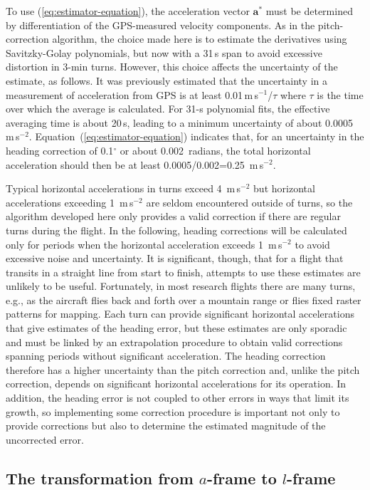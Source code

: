 \documentclass[english,british,amtd,bookmarks=false,unicode=true]{copernicus}\usepackage[]{graphicx}\usepackage[]{color}
\begin{document}
To use (\ref{eq:estimator-equation}), the acceleration vector $\mathbf{a^{*}}$
must be determined by differentiation of the GPS-measured velocity
components. As in the pitch-correction algorithm, the choice made
here is to estimate the derivatives using Savitzky-Golay polynomials,
but now with a 31\,s span to avoid excessive distortion in 3-min
turns. However, this choice affects the uncertainty of the estimate,
as follows. It was previously estimated that the uncertainty in a
measurement of acceleration from GPS is at least 0.01\,m\,s$^{-1}$/$\tau$
where $\tau$ is the time over which the average is calculated. For
31-s polynomial fits, the effective averaging time is about 20\,s,
leading to a minimum uncertainty of about 0.0005\,m\,s$^{-2}$.
Equation~(\ref{eq:estimator-equation}) indicates that, for an uncertainty
in the heading correction of 0.1$^{\circ}$ or about 0.002~radians,
the total horizontal acceleration should then be at least 0.0005/0.002=0.25~m\,s$^{-2}$.

Typical horizontal accelerations in turns exceed 4~m\,s$^{-2}$
but horizontal accelerations exceeding 1~m\,s$^{-2}$ are seldom
encountered outside of turns, so the algorithm developed here only
provides a valid correction if there are regular turns during the
flight. In the following, heading corrections will be calculated only
for periods when the horizontal acceleration exceeds 1~m\,s$^{-2}$
to avoid excessive noise and uncertainty. It is significant, though,
that for a flight that transits in a straight line from start to finish,
attempts to use these estimates are unlikely to be useful. Fortunately,
in most research flights there are many turns, e.g., as the aircraft
flies back and forth over a mountain range or flies fixed raster patterns
for mapping. Each turn can provide significant horizontal accelerations
that give estimates of the heading error, but these estimates are
only sporadic and must be linked by an extrapolation procedure to
obtain valid corrections spanning periods without significant acceleration.
The heading correction therefore has a higher uncertainty than the
pitch correction and, unlike the pitch correction, depends on significant
horizontal accelerations for its operation. In addition, the heading
error is not coupled to other errors in ways that limit its growth,
so implementing some correction procedure is important not only to
provide corrections but also to determine the estimated magnitude
of the uncorrected error.


\subsection{The transformation from $a$-frame to $l$-frame}
\end{document}
